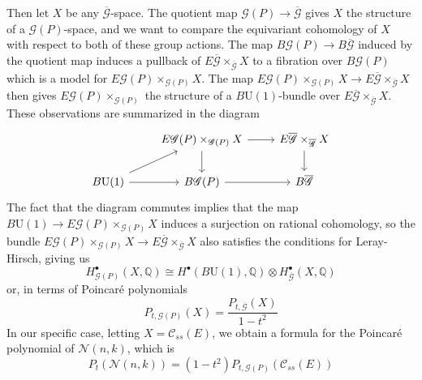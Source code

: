 \documentclass[psamsfonts, 12pt]{amsart}
\theoremstyle{definition}
\theoremstyle{remark}
\newcommand{\Q}{\mathbb{Q}}
\begin{document}
Then let $X$ be any $\overline{\mathscr{G}}$-space. The quotient map
$\mathscr{G}(P) \to \overline{\mathscr{G}}$ gives $X$ the structure of a
$\mathscr{G}(P)$-space, and we want to compare the equivariant cohomology of $X$
with respect to both of these group actions. The map
$B\mathscr{G}(P) \to B\overline{\mathscr{G}}$ induced by the quotient map induces
a pullback of $E\overline{\mathscr{G}}\times_{\overline{\mathscr{G}}} X$ to a
fibration over $B\mathscr{G}(P)$ which is a model for
$E\mathscr{G}(P) \times_{\mathscr{G}(P)} X$. The map
$E\mathscr{G}(P) \times_{\mathscr{G}(P)} X \to
E\overline{\mathscr{G}}\times_{\overline{\mathscr{G}}} X$ then gives
$E\mathscr{G}(P) \times_{\mathscr{G}(P)}$ the structure of a $B\mathrm{U}(1)$-bundle
over $E\overline{\mathscr{G}}\times_{\overline{\mathscr{G}}} X$. These observations
are summarized in the diagram
\[\begin{tikzcd}
& E\mathscr{G}(P) \times_{\mathscr{G}(P)} X \ar[r] \ar[d]
& E\overline{\mathscr{G}}\times_{\overline{\mathscr{G}}} X \ar[d] \\
B\mathrm{U}(1) \ar[ur]\ar[r] & B\mathscr{G}(P) \ar[r] & B\overline{\mathscr{G}}
\end{tikzcd}\]
The fact that the diagram commutes implies that the map
$B\mathrm{U}(1) \to E\mathscr{G}(P) \times_{\mathscr{G}(P)} X$ induces a surjection on
rational cohomology, so the bundle $E\mathscr{G}(P) \times_{\mathscr{G}(P)} X \to
E\overline{\mathscr{G}}\times_{\overline{\mathscr{G}}} X$ also satisfies
the conditions for Leray-Hirsch, giving us
\[
H^\bullet_{\mathscr{G}(P)}(X,\Q)
\cong H^\bullet(B\mathrm{U}(1), \Q) \otimes H^\bullet_{\overline{\mathscr{G}}}(X,\Q)
\]
or, in terms of Poincar\'e polynomials
\[
P_{t,\mathscr{G}(P)}(X) = \frac{P_{t,\overline{\mathscr{G}}}(X)}{1-t^2}
\]
In our specific case, letting $X = \mathscr{C}_{ss}(E)$, we obtain a formula
for the Poincar\'e polynomial of $\mathcal{N}(n,k)$, which is
\[
P_t(\mathcal{N}(n,k)) = (1-t^2)P_{t,\mathscr{G}(P)}(\mathscr{C}_{ss}(E))
\]
%
\end{document}
